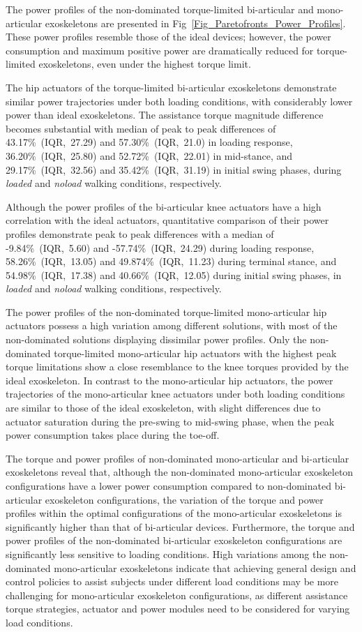 \documentclass[10pt,letterpaper]{article}
\begin{document}
The power profiles of the non-dominated torque-limited bi-articular and mono-articular exoskeletons are presented in Fig~\ref{Fig_Paretofronts_Power_Profiles}. These power profiles resemble those of the ideal devices; however, the power consumption and maximum positive power are dramatically reduced for torque-limited exoskeletons, even under the highest torque limit.

The hip actuators of the torque-limited bi-articular exoskeletons demonstrate similar power trajectories under both loading conditions, with considerably lower power than ideal exoskeletons. The assistance torque magnitude difference becomes substantial with  median of peak to peak differences of 43.17\%~(IQR,~27.29) and 57.30\%~(IQR,~21.0) in loading response, 36.20\%~(IQR,~25.80) and 52.72\%~(IQR,~22.01) in mid-stance, and 29.17\%~(IQR,~32.56) and 35.42\%~(IQR,~31.19) in initial swing phases, during \emph{loaded} and \emph{noload} walking conditions, respectively.
	
Although the power profiles of the bi-articular knee actuators have a high correlation with the ideal actuators, quantitative comparison of their power profiles demonstrate peak to peak differences with a median of -9.84\%~(IQR,~5.60) and -57.74\%~(IQR,~24.29) during loading response, 58.26\%~(IQR,~13.05) and 49.874\%~(IQR,~11.23) during terminal stance, and 54.98\%~(IQR,~17.38) and 40.66\%~(IQR,~12.05) during initial swing phases, in \emph{loaded} and \emph{noload} walking conditions, respectively.

The power profiles of the non-dominated torque-limited mono-articular hip actuators possess a high variation among different solutions, with most of the non-dominated solutions displaying dissimilar power profiles. Only the non-dominated torque-limited mono-articular hip actuators with the highest peak torque limitations show a close resemblance to the knee torques provided by the ideal exoskeleton. In contrast to the mono-articular hip actuators, the power trajectories of the mono-articular  knee actuators under both loading conditions are similar to those of the ideal exoskeleton, with slight differences due to actuator saturation during the pre-swing to mid-swing phase, when the peak power consumption takes place during the toe-off.


The torque and power profiles of non-dominated mono-articular and bi-articular exoskeletons reveal that, although the non-dominated mono-articular exoskeleton configurations have a lower power consumption compared to non-dominated bi-articular exoskeleton configurations, the variation of the torque and power profiles within the optimal configurations of the mono-articular exoskeletons is significantly higher than that of bi-articular devices. Furthermore, the torque and power profiles of the non-dominated bi-articular exoskeleton configurations are significantly less sensitive to loading conditions. High variations among the non-dominated mono-articular exoskeletons indicate that achieving general design and control policies to assist subjects under different load conditions may be more challenging for mono-articular exoskeleton configurations, as different assistance torque strategies,  actuator and power modules need to be considered for varying load conditions.
\end{document}
